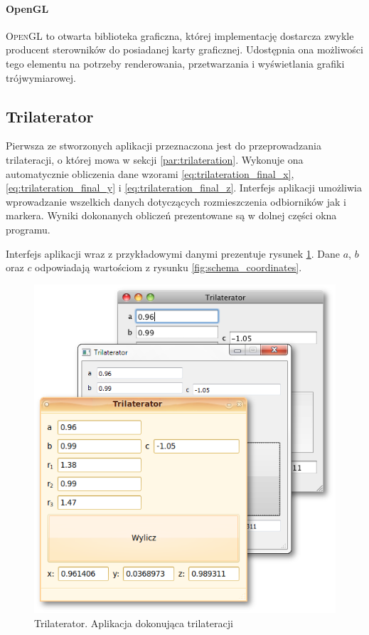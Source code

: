 \paragraph{OpenGL}
\textsc{OpenGL} to otwarta biblioteka graficzna, której implementację dostarcza zwykle producent sterowników do posiadanej karty graficznej. Udostępnia ona możliwości tego elementu na potrzeby renderowania, przetwarzania i wyświetlania grafiki trójwymiarowej.

\subsection{Trilaterator}
Pierwsza ze stworzonych aplikacji przeznaczona jest do przeprowadzania trilateracji, o której mowa w sekcji \ref{par:trilateration}. Wykonuje ona automatycznie obliczenia dane wzorami \ref{eq:trilateration_final_x}, \ref{eq:trilateration_final_y} i \ref{eq:trilateration_final_z}. Interfejs aplikacji umożliwia wprowadzanie wszelkich danych dotyczących rozmieszczenia odbiorników jak i markera. Wyniki dokonanych obliczeń prezentowane są w dolnej części okna programu.

Interfejs aplikacji wraz z przykładowymi danymi prezentuje rysunek \ref{fig:trilaterator}. Dane $a$, $b$ oraz $c$ odpowiadają wartościom z rysunku \ref{fig:schema_coordinates}.

\begin{figure}[t]
 \includegraphics[width=\textwidth]{gfx/trilaterator_triple.png}
 \caption{Trilaterator. Aplikacja dokonująca trilateracji}
 \label{fig:trilaterator}
\end{figure}

